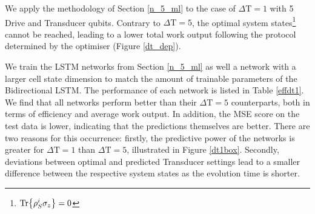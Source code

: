 We apply the methodology of Section \ref{n_5_ml} to the case of $\Delta \mathrm{T} = 1$ with 5 Drive and Transducer qubits.
Contrary to $\Delta \mathrm{T} = 5$, the optimal system states\footnote{$\Tr{\rho_S^i \sigma_z} = 0$} cannot be reached, leading to a lower total work output following the protocol determined by the optimiser (Figure \ref{dt_dep}).

We train the LSTM networks from Section \ref{n_5_ml} as well a network with a larger cell state dimension to match the amount of trainable parameters of the Bidirectional LSTM.
The performance of each network is listed in Table \ref{effdt1}.
We find that all networks perform better than their $\Delta \mathrm{T} = 5$ counterparts, both in terms of efficiency and average work output.
In addition, the MSE score on the test data is lower, indicating that the predictions themselves are better.
There are two reasons for this occurrence: firstly, the predictive power of the networks is greater for $\Delta \mathrm{T} = 1$ than $\Delta \mathrm{T} = 5$, illustrated in Figure \ref{dt1box}.
Secondly, deviations between optimal and predicted Transducer settings lead to a smaller difference between the respective system states as the evolution time is shorter.

